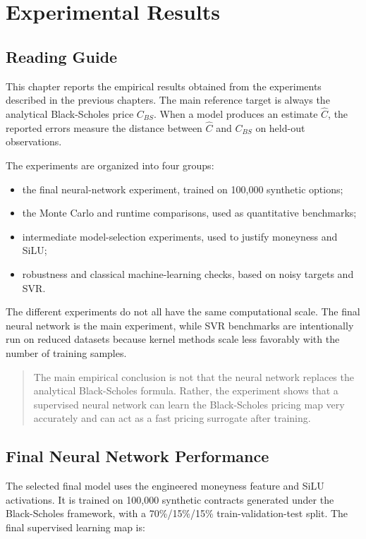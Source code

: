 \chapter{Experimental Results}

\section{Reading Guide}

This chapter reports the empirical results obtained from the experiments described in the previous chapters.
The main reference target is always the analytical Black-Scholes price $C_{BS}$.
When a model produces an estimate $\hat{C}$, the reported errors measure the distance between $\hat{C}$ and $C_{BS}$ on held-out observations.

The experiments are organized into four groups:

\begin{itemize}
    \item the final neural-network experiment, trained on 100,000 synthetic options;
    \item the Monte Carlo and runtime comparisons, used as quantitative benchmarks;
    \item intermediate model-selection experiments, used to justify moneyness and SiLU;
    \item robustness and classical machine-learning checks, based on noisy targets and SVR.
\end{itemize}
The different experiments do not all have the same computational scale.
The final neural network is the main experiment, while SVR benchmarks are intentionally run on reduced datasets because kernel methods scale less favorably with the number of training samples.

\begin{quote}
    The main empirical conclusion is not that the neural network replaces the analytical Black-Scholes formula.
    Rather, the experiment shows that a supervised neural network can learn the Black-Scholes pricing map very accurately and can act as a fast pricing surrogate after training.
\end{quote}

\section{Final Neural Network Performance}

The selected final model uses the engineered moneyness feature and SiLU activations.
It is trained on 100,000 synthetic contracts generated under the Black-Scholes framework, with a 70\%/15\%/15\% train-validation-test split.
The final supervised learning map is:

